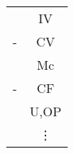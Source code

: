
\begin{table}[h]
\Large
\center
	\begin{tabular}{rc}
	  & IV \\
	- & CV \\ \hline
	  & Mc	\\
	- & CF	\\ \hline
	  & U,OP \\
	  & \vdots
	\end{tabular}
\end{table}

